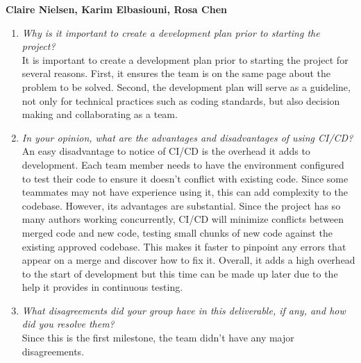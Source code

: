 \documentclass{article}
\begin{document}
\textbf{Claire Nielsen, Karim Elbasiouni, Rosa Chen}
\begin{enumerate}
    \item \textit{Why is it important to create a development plan prior to starting the project?}\\
    It is important to create a development plan prior to starting the project for several reasons. First, it ensures the team is on the same page about the problem to be solved. Second, the development plan will serve as a guideline, not only for technical practices such as coding standards, but also decision making and collaborating as a team.
    \item \textit{In your opinion, what are the advantages and disadvantages of using CI/CD?}\\
    An easy disadvantage to notice of CI/CD is the overhead it adds to development. Each team member needs to have the environment configured to test their code to ensure it doesn’t conflict with existing code. Since some teammates may not have experience using it, this can add complexity to the codebase. However, its advantages are substantial. Since the project has so many authors working concurrently, CI/CD will minimize conflicts between merged code and new code, testing small chunks of new code against the existing approved codebase. This makes it faster to pinpoint any errors that appear on a merge and discover how to fix it. Overall, it adds a high overhead to the start of development but this time can be made up later due to the help it provides in continuous testing. 
    \item \textit{What disagreements did your group have in this deliverable, if any, and how did you resolve them?}\\
    Since this is the first milestone, the team didn’t have any major disagreements. 
\end{enumerate}
\end{document}
